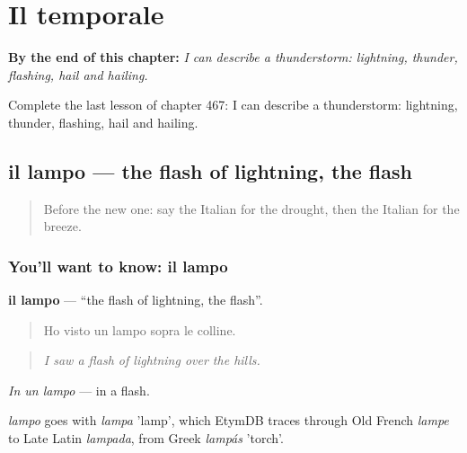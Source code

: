 
\chapter{Il temporale}
\label{ch:it-il-temporale}

\begin{chapteropening}
\textbf{By the end of this chapter:} \emph{I can describe a thunderstorm: lightning, thunder, flashing, hail and hailing.}

Complete the last lesson of chapter 467: I can describe a thunderstorm: lightning, thunder, flashing, hail and hailing.
\end{chapteropening}

\section[il lampo]{il lampo — the flash of lightning, the flash}

\label{lesson:IT-C467-lampo}



\begin{quote}
Before the new one: say the Italian for the drought, then the Italian for the breeze.
\end{quote}

\subsection*{You'll want to know: il lampo}
\textbf{il lampo} — \textquotedblleft{}the flash of lightning, the flash\textquotedblright{}.

\begin{quote}
Ho visto un lampo sopra le colline.
\end{quote}

\begin{quote}
\emph{I saw a flash of lightning over the hills.}
\end{quote}

\emph{In un lampo} — in a flash.

\begin{cousinweb}
\emph{lampo} goes with \emph{lampa} 'lamp', which EtymDB traces through Old French \emph{lampe} to Late Latin \emph{lampada}, from Greek \emph{lampás} 'torch'.
\end{cousinweb}

